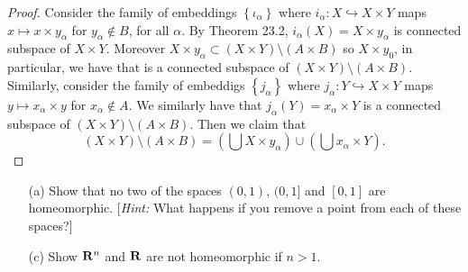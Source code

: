 \begin{proof}
Consider the family of embeddings $\left\{\iota_\alpha\right\}$
where $i_\alpha\colon X\hookrightarrow X\times Y$ maps
$x\mapsto x\times y_\alpha$ for $y_\alpha\notin B$, for all
$\alpha$. By Theorem 23.2, $i_\alpha(X)=X\times y_\alpha$ is
connected subspace of $X\times Y$. Moreover $X\times
y_\alpha\subset(X\times Y)\setminus(A\times B)$ so $X\times y_0$,
in particular, we have that is a connected subspace of $(X\times
Y)\setminus(A\times B)$. Similarly, consider the family of
embeddigs $\left\{j_\alpha\right\}$ where $j_\alpha\colon
Y\hookrightarrow X\times Y$ maps $y\mapsto x_\alpha\times y$ for
$x_\alpha\notin A$. We similarly have that
$j_\alpha(Y)=x_\alpha\times Y$ is a connected subspace of
$(X\times Y)\setminus(A\times B)$. Then we claim that
\[
(X\times Y)\setminus(A\times B)
=\left(\bigcup X\times y_\alpha\right)\cup\left(\bigcup x_\alpha\times Y\right).
\]

\end{proof}
\newpage
\begin{problem}[Munkres \S24, Ex.\,1(ac)]
\begin{enumerate}[noitemsep]
\item[(a)] Show that no two of the spaces $(0,1)$, $(0,1]$ and
  $[0,1]$ are homeomorphic. [\emph{Hint:} What happens if you
  remove a point from each of these spaces?]
\item[(c)] Show $\mathbf{R}^n$ and $\mathbf{R}$ are not homeomorphic if $n>1$.
\end{enumerate}
\end{problem}
